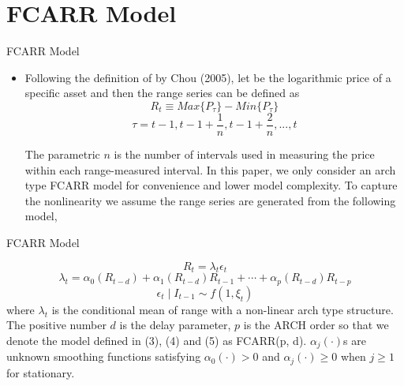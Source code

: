 \documentclass{beamer}
\begin{document}

\section{FCARR Model}

\begin{frame}{FCARR Model}
  \begin{itemize}
  \item {
    Following the definition of by Chou (2005), let   be the logarithmic price of a specific asset and then the range series can be defined as
    \begin{equation}
         R_t \equiv Max\{P_{\tau}\} -  Min\{P_{\tau}\}
    \end{equation}
    \begin{equation}
        \tau = t-1,t-1+\frac{1}{n},t-1+\frac{2}{n},...,t
    \end{equation}
    
    The parametric $n$ is the number of intervals used in measuring the price within each range-measured interval. In this paper, we only consider an arch type FCARR model for convenience and lower model complexity. To capture the nonlinearity we assume the range series are generated from the following model,
  }
   \end{itemize}
\end{frame}

\begin{frame}{FCARR Model}
  \begin{itemsize}
  \item {   
    \begin{equation}
         R_t = \lambda_t \epsilon_t
    \end{equation}
    \begin{equation}
        \lambda_t = \alpha_0(R_{t-d}) + \alpha_1(R_{t-d})R_{t-1} + \cdots + \alpha_p(R_{t-d})R_{t-p}
    \end{equation}
    \begin{equation}
         \epsilon_t \mid I_{t-1} \sim f(1, \xi_t)
    \end{equation}
    where $\lambda_t$ is the conditional mean of range with a non-linear arch type structure. The positive number $d$ is the delay parameter, $p$ is the ARCH order so that we denote the model defined in (3), (4) and (5) as FCARR(p, d). $\alpha_j(\cdot)$s are unknown smoothing functions satisfying $\alpha_0(\cdot) > 0$  and $\alpha_j(\cdot) \geq 0$ when $j \geq 1$ for stationary. 
  }
  \end{itemsize}
\end{frame}
\end{document}
